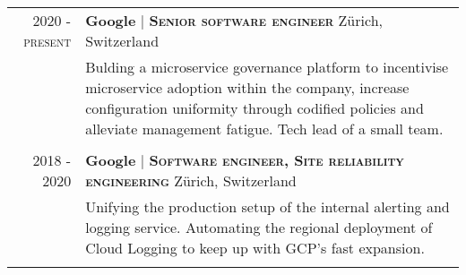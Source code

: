 \documentclass[a4paper,10pt]{article} %
\begin{document}
\begin{tabularx}{\textwidth}{p{0.19cm}r|X}

    \multicolumn{2}{r|}{2020 - \textsc{present}} & \textbf{\large Google} \hspace{0.2cm} | \hspace{0.01cm} \textbf{\textsc{Senior software engineer}} \hfill Zürich, Switzerland                                                                                                                                                                       \\
                                                 &                                                                                                                                             & Bulding a microservice governance platform to incentivise microservice adoption within the company, increase configuration uniformity through codified policies and alleviate management fatigue. Tech lead of a small team.  \\
    \multicolumn{2}{c}{\vspace{-0.2cm}}                                                                                                                                                                                                                                                                                                       \\

    \multicolumn{2}{r|}{2018 - 2020}             & \textbf{\large Google} \hspace{0.2cm} | \hspace{0.01cm} \textbf{\textsc{Software engineer, Site reliability engineering}} \hfill Zürich, Switzerland                                                                                                                                                \\
                                                 &                                                                                                                                             & Unifying the production setup of the internal alerting and logging service. Automating the regional deployment of Cloud Logging to keep up with GCP's fast expansion. \\
    \multicolumn{2}{c}{\vspace{-0.2cm}}                                                                                                                                                                                                                                                                                                       \\


\end{tabularx}
\end{document}
